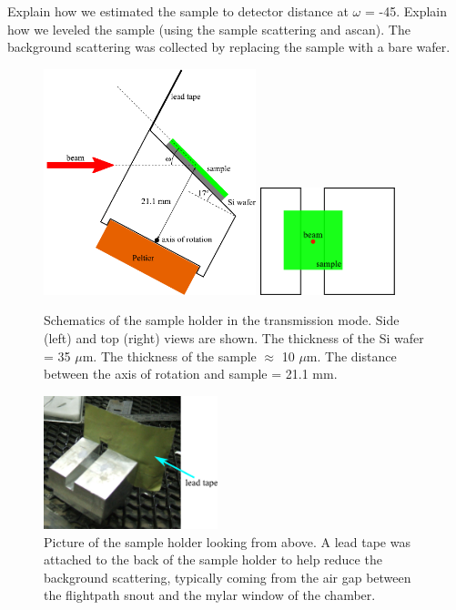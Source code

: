 Explain how we estimated the sample to detector distance at
$\omega$ = -45\textdegree. Explain how we leveled the sample 
(using the sample scattering and ascan).
The background scattering was collected by replacing the sample with a bare 
wafer.

\begin{figure}[htbp]
  \centering
  \includegraphics[width=0.55\textwidth]{figures/ripple/MMs/transmission/holder_side}
  \includegraphics[width=0.35\textwidth]{figures/ripple/MMs/transmission/holder_top}
  \caption{Schematics of the sample holder in the transmission mode.
  Side (left) and top (right) views are shown. The thickness of the Si wafer
  = 35 $\mu$m. The thickness of the sample $\approx$ 10 $\mu$m. The
  distance between the axis of rotation and sample = 21.1 mm.}
  \label{fig:holder_schematic}
\end{figure}

\begin{figure}[htbp]
  \centering
  \includegraphics[width=0.45\textwidth]{figures/ripple/MMs/transmission/sample_holder1}
  \caption{Picture of the sample holder looking from above. A lead tape was
  attached to the back of the sample holder to help reduce the background 
  scattering, typically coming from the air gap between the flightpath snout
  and the mylar window of the chamber.}
  \label{fig:holder_picture}
\end{figure}


